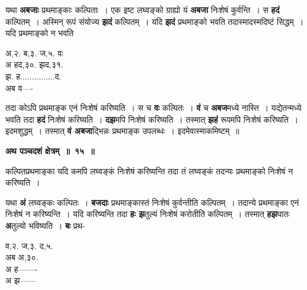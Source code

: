 \documentclass[11pt, openany]{book}
\begin{document}
\begin{flushleft}
\begin{minipage}[t]{0.65\textwidth}
\hspace{4mm} यथा \textbf{अबजाः} प्रथमाङ्काः कल्पिताः~। एक इष्ट लघ्वङ्को ग्राह्यो यं \textbf{अबजा} निःशेषं कुर्वन्ति~। स \textbf{हदं} कल्पितम्~। अस्मिन् रूपं संयोज्य \textbf{झदं} कल्पितम्~। यदि \textbf{झदं} प्रथमाङ्को भवति तदास्मादस्मदिष्टं सिद्धम्~। यदि प्रथमाङ्को न भवति
\end{minipage} 
\hfill
\begin{minipage}[t]{0.25\textwidth}
अ,२. ब,३. ज,५. वः\\
{\color{white}अ} हद,३०. झद,३१.\\ 
झ. ह...............द.\\
{\color{white}अब} व----
\end{minipage}
\end{flushleft}
\vspace{-3mm}

\noindent  तदा कोऽपि प्रथमाङ्क एनं निःशेषं करिष्यति~। स च \textbf{वः} कल्पितः~। \textbf{वं} च \textbf{अबज}मध्ये नास्ति~। यद्येतन्मध्ये भवति तदा \textbf{हदं} निःशेषं करिष्यति~। \textbf{दझ}मपि निःशेषं करिष्यति~। तस्मात् \textbf{झहं} रूपमपि निःशेषं करिष्यति~। इदमशुद्धम्~। तस्मात् \textbf{वं अबजा}द्भिन्नः प्रथमाङ्क उपलब्धः~। इदमेवास्माकमिष्टम्~॥ 
\vspace{2mm}

\begin{center}
\textbf{\large अथ पञ्चदशं क्षेत्रम्~॥~१५~॥}
\end{center}

 {\ab कल्पितप्रथमाङ्का यदि कमपि लघ्वङ्कं निःशेषं करिष्यन्ति तदा तं लघ्वङ्कं तदन्यः प्रथमाङ्को निःशेषं न करिष्यति~। }

\begin{flushleft}
\begin{minipage}[t]{0.7\textwidth}
\hspace{4mm} यथा \textbf{अं} लघ्वङ्कः कल्पितः~। \textbf{बजदाः} प्रथमाङ्कास्तं निःशेषं कुर्वन्तीति कल्पितम्~। तदान्ये प्रथमाङ्का एनं निःशेषं न करिष्यन्ति~। यदि करिष्यन्ति तदा \textbf{हः झ}तुल्यं निःशेषं करोतीति कल्पितम्~। तस्मात् \textbf{हझ}घातः \textbf{अ}तुल्यो भविष्यति~। \textbf{बः} प्रथ-
\end{minipage} 
\hfill
\begin{minipage}[t]{0.2\textwidth}
व,२. ज,३. द,५.\\
{\color{white}अब} अ,३०.\\
{\color{white}अ} ह-------\\
{\color{white}अ} झ------
\end{minipage}
\end{flushleft}
\vspace{-3mm}
\end{document}
